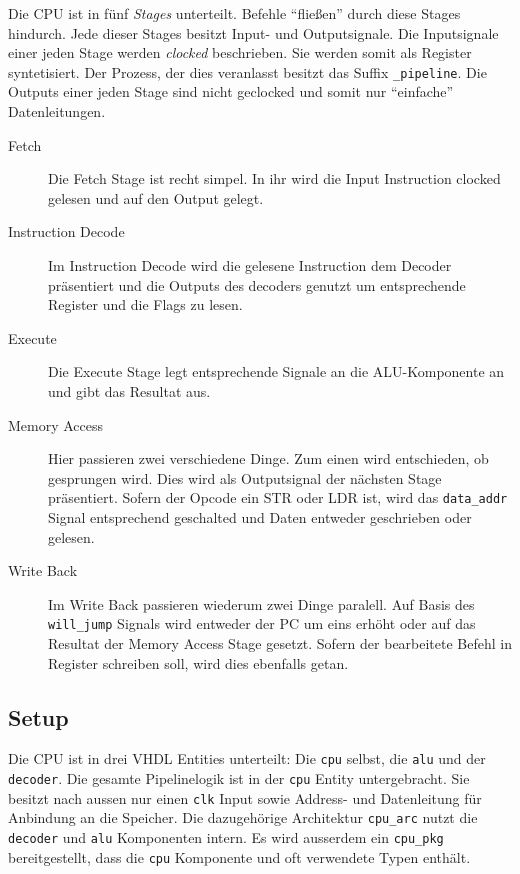 \documentclass[paper=a4,fontsize=12pt]{scrreprt}
\begin{document}
Die CPU ist in fünf \textit{Stages} unterteilt.
Befehle \enquote{fließen} durch diese Stages hindurch.
Jede dieser Stages besitzt Input- und Outputsignale.
Die Inputsignale einer jeden Stage werden \textit{clocked} beschrieben.
Sie werden somit als Register syntetisiert.
Der Prozess, der dies veranlasst besitzt das Suffix \texttt{\_pipeline}.
Die Outputs einer jeden Stage sind nicht geclocked und somit nur \enquote{einfache} Datenleitungen.

\begin{description}
  \item[Fetch]
  Die Fetch Stage ist recht simpel.
  In ihr wird die Input Instruction clocked gelesen und auf den Output gelegt.
  \item[Instruction Decode]
  Im Instruction Decode wird die gelesene Instruction dem Decoder präsentiert und die Outputs des decoders genutzt um entsprechende Register und die Flags zu lesen.
  \item[Execute]
  Die Execute Stage legt entsprechende Signale an die ALU-Komponente an und gibt das Resultat aus.
  \item[Memory Access]
  Hier passieren zwei verschiedene Dinge.
  Zum einen wird entschieden, ob gesprungen wird. Dies wird als Outputsignal der nächsten Stage präsentiert.
  Sofern der Opcode ein STR oder LDR ist, wird das \texttt{data\_addr} Signal entsprechend geschalted und Daten entweder geschrieben oder gelesen.
  \item[Write Back]
  Im Write Back passieren wiederum zwei Dinge paralell.
  Auf Basis des \texttt{will\_jump} Signals wird entweder der PC um eins erhöht oder auf das Resultat der Memory Access Stage gesetzt.
  Sofern der bearbeitete Befehl in Register schreiben soll, wird dies ebenfalls getan.
\end{description}

\subsection{Setup}

Die CPU ist in drei VHDL Entities unterteilt: Die \texttt{cpu} selbst, die \texttt{alu} und der \texttt{decoder}.
Die gesamte Pipelinelogik ist in der \texttt{cpu} Entity untergebracht.
Sie besitzt nach aussen nur einen \texttt{clk} Input sowie Address- und Datenleitung für Anbindung an die Speicher\footnotemark.
Die dazugehörige Architektur \texttt{cpu\_arc} nutzt die \texttt{decoder} und \texttt{alu} Komponenten intern.
Es wird ausserdem ein \texttt{cpu\_pkg} bereitgestellt, dass die \texttt{cpu} Komponente und oft verwendete Typen enthält.
\end{document}
